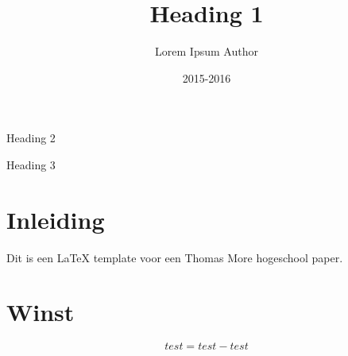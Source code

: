 \documentclass[11pt, a4paper, oneside]{book}
\title{Heading 1}
\date{2015-2016}
\author{Lorem Ipsum Author}
\begin{document}
	\begin{titlepage}
				\vspace*{130mm}
				\begin{flushright}
				\bf
				\color{oranjerood}
				{
					\scshape	
					\huge
					\selectfont
					\thetitle
				}
				
				\vspace{0mm}
				\LARGE
				Heading 2
				\end{flushright}
				\vspace{\fill}
				{\color{blauwgroen} Heading 3}

				\newpage

	\end{titlepage}


\tableofcontents

\newpage




\chapter{Inleiding}

Dit is een LaTeX template voor een Thomas More hogeschool paper.

\newpage

\chapter{Winst}

	\begin{mdframed}[backgroundcolor=grijs!40,shadow=false,roundcorner=8pt]
		$$test = test - test$$
	\end{mdframed}
\end{document}
